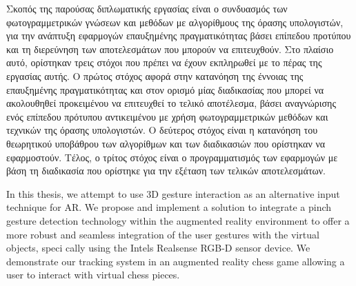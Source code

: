 Σκοπός της παρούσας διπλωματικής εργασίας είναι ο συνδυασμός των φωτογραμμετρικών γνώσεων και μεθόδων με αλγορίθμους της όρασης υπολογιστών, για την ανάπτυξη εφαρμογών επαυξημένης πραγματικότητας βάσει επίπεδου προτύπου και τη διερεύνηση των αποτελεσμάτων που μπορούν να επιτευχθούν. Στο πλαίσιο αυτό, ορίστηκαν τρεις στόχοι που πρέπει να έχουν εκπληρωθεί με το πέρας της εργασίας αυτής. Ο πρώτος στόχος αφορά στην κατανόηση της έννοιας της επαυξημένης πραγματικότητας και στον ορισμό μίας διαδικασίας που μπορεί να ακολουθηθεί προκειμένου να επιτευχθεί το τελικό αποτέλεσμα, βάσει αναγνώρισης ενός επίπεδου πρότυπου αντικειμένου με χρήση φωτογραμμετρικών μεθόδων και τεχνικών της όρασης υπολογιστών. Ο δεύτερος στόχος είναι η κατανόηση του θεωρητικού υποβάθρου των αλγορίθμων και των διαδικασιών που ορίστηκαν να εφαρμοστούν. Τέλος, ο τρίτος στόχος είναι ο προγραμματισμός των εφαρμογών με βάση τη διαδικασία που ορίστηκε για την εξέταση των τελικών αποτελεσμάτων.



In this thesis, we attempt to use 3D gesture interaction as an alternative input technique for AR. We propose and implement a solution to integrate a pinch gesture detection technology within the augmented reality environment to offer a more robust and seamless integration of the user gestures with the virtual objects, speci cally using the Intels Realsense RGB-D sensor device. We demonstrate our tracking system in an augmented reality chess game allowing a user to interact with virtual chess pieces.


